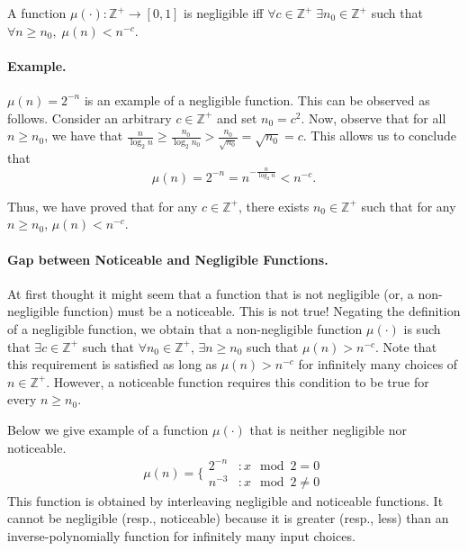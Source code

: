 \documentclass[12pt]{tufte-book}
\begin{document}
\begin{definition}
A function $\mu(\cdot): \mathbb{Z}^+ \rightarrow [0,1]$ is negligible iff $\forall c \in \mathbb{Z}^+ \; \exists n_0 \in \mathbb{Z}^+$ such that $\forall n \geq n_0 , \; \mu(n) < n^{-c}$.
\end{definition}

\paragraph{Example.} $\mu(n) = 2^{-n}$ is an example of a negligible function. This can be observed as follows.
Consider an arbitrary $c \in \mathbb{Z}^+$ and set $n_0 = c^2$. Now, observe that for all $n \geq n_0$, we have that $\frac{n}{\log_2 n} \geq \frac{n_0}{\log_2 n_0} > \frac{n_0}{\sqrt{n_0}} = \sqrt{n_0} = c$. This allows us to conclude that $$\mu(n) = 2^{-n} = n^{-\frac{n}{\log_2 n}} < n^{-c}.$$

Thus, we have proved that for any $c \in \mathbb{Z}^+$, there exists $n_0 \in \mathbb{Z}^+$ such that for any $n \geq n_0$, $\mu(n) < n^{-c}$.

\paragraph{Gap between Noticeable and Negligible Functions.}
At first thought it might seem that a function that is {not} negligible (or, a non-negligible function) must be a noticeable. This is not true!\cite{JC:Bellare02} Negating the definition of a negligible function, we obtain that a non-negligible function $\mu(\cdot)$ is such that $\exists c \in \mathbb{Z}^+$ such that $\forall n_0 \in \mathbb{Z}^+$, $\exists n \geq n_0$ such that $\mu(n) > n^{-c}$.
Note that this requirement is satisfied as long as $\mu(n) > n^{-c}$ for infinitely many choices of $n \in \mathbb{Z}^+$. However, a noticeable function requires this condition to be true for every $n \geq n_0$.

Below we give example of a function $\mu(\cdot)$ that is neither negligible nor noticeable.
$$\mu(n) = \Big\{
\begin{array}{ll}
  2^{-n} & : x \mod 2 = 0\\
  n^{-3} & : x \mod 2 \neq 0
\end{array}
$$
This function is obtained by interleaving negligible and  noticeable functions. It cannot be negligible (resp., noticeable) because it is greater (resp., less) than an inverse-polynomially function for infinitely many input choices.
\end{document}
